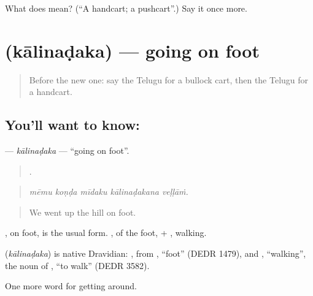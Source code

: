 \begin{tcolorbox}[breakable,colback=teal!4,colframe=teal!35!black,title={Before you move on}]
What does  mean? (\textquotedblleft{}A handcart; a pushcart\textquotedblright{}.) Say it once more.
\end{tcolorbox}
\section[\texorpdfstring{\te{కాలినడక} (kālinaḍaka)}{కాలినడక (kālinaḍaka)}]{ (kālinaḍaka) — going on foot}

\label{lesson:TE-C451-kalinadaka}



\begin{quote}
Before the new one: say the Telugu for a bullock cart, then the Telugu for a handcart.
\end{quote}

\subsection*{You'll want to know: }
\textbf{} — \emph{kālinaḍaka} — \textquotedblleft{}going on foot\textquotedblright{}.

\begin{quote}
    .
\end{quote}

\begin{quote}
\emph{mēmu koṇḍa mīdaku kālinaḍakana veḷḷāṁ.}
\end{quote}

\begin{quote}
We went up the hill on foot.
\end{quote}

, on foot, is the usual form. , of the foot, + , walking.

\begin{cousinweb}
\textbf{} (\emph{kālinaḍaka}) is native Dravidian: , from , \textquotedblleft{}foot\textquotedblright{} (DEDR 1479), and , \textquotedblleft{}walking\textquotedblright{}, the noun of , \textquotedblleft{}to walk\textquotedblright{} (DEDR 3582).
\end{cousinweb}

\begin{grammarlens}[title={What you've built}]
One more word for getting around.
\end{grammarlens}

